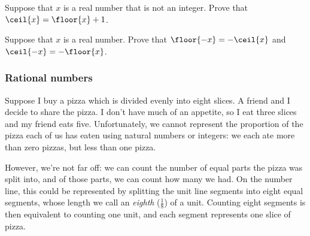 \begin{exercise}
\label{exFloorCeilingOfNonInteger}
Suppose that $x$ is a real number that is not an integer. Prove that $\ceil{x} = \floor{x} + 1$.
%
%
\end{exercise}

\begin{exercise}
Suppose that $x$ is a real number. Prove that $\floor{-x} = -\ceil{x}$ and $\ceil{-x} = -\floor{x}$.
%
\end{exercise}

\subsubsection*{Rational numbers}

Suppose I buy a pizza which is divided evenly into eight slices. A friend and I decide to share the pizza. I don't have much of an appetite, so I eat three slices and my friend eats five. Unfortunately, we cannot represent the proportion of the pizza each of us has eaten using natural numbers or integers: we each ate more than zero pizzas, but less than one pizza.

However, we're not far off: we can count the number of equal parts the pizza was split into, and of those parts, we can count how many we had. On the number line, this could be represented by splitting the unit line segments into eight equal segments, whose length we call an \textit{eighth} ($\frac{1}{8}$) of a unit. Counting eight segments is then equivalent to counting one unit, and each segment represents one slice of pizza.

